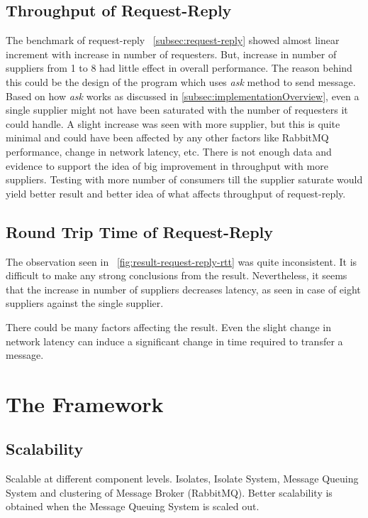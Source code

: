 \subsection{Throughput of Request-Reply}
  The benchmark of request-reply ~\autoref{subsec:request-reply} showed almost linear increment with increase in number of requesters. But, increase in number of suppliers from 1 to 8 had little effect in overall performance. The reason behind this could be the design of the program which uses \emph{ask} method to send message. Based on how \emph{ask} works as discussed in \autoref{subsec:implementationOverview}, even a single supplier might not have been saturated with the number of requesters it could handle. A slight increase was seen with more supplier, but this is quite minimal and could have been affected by any other factors like RabbitMQ performance, change in network latency, etc. There is not enough data and evidence to support the idea of big improvement in throughput with more suppliers. Testing with more number of consumers till the supplier saturate would yield better result and better idea of what affects throughput of request-reply.

\subsection{Round Trip Time of Request-Reply}
  The observation seen in ~\autoref{fig:result-request-reply-rtt} was quite inconsistent. It is difficult to make any strong conclusions from the result. Nevertheless, it seems that the increase in number of suppliers decreases latency, as seen in case of eight suppliers against the single supplier.

  There could be many factors affecting the result. Even the slight change in network latency can induce a significant change in time required to transfer a message.


\section{The Framework}

\subsection{Scalability}
    Scalable at different component levels. Isolates, Isolate System, Message Queuing System and clustering of Message Broker (RabbitMQ). Better scalability is obtained when the Message Queuing System is scaled out.

